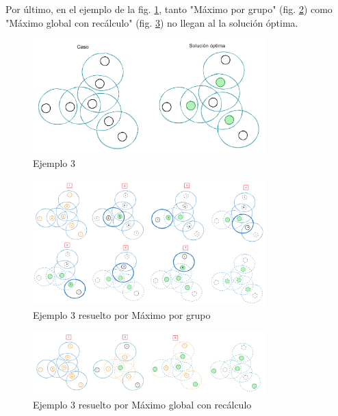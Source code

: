 Por último, en el ejemplo de la fig. \ref{fig:greedy_ej3}, tanto "Máximo por grupo" (fig. \ref{fig:greedy_ej3_mpg}) como "Máximo global con recálculo" (fig. \ref{fig:greedy_ej3_mgr}) no llegan al la solución óptima.

\begin{figure}[H]
    \centering
    \includegraphics[width=0.8\textwidth]{img/greedy_ej3.png}
    \caption{Ejemplo 3}
    \label{fig:greedy_ej3}
\end{figure}

\begin{figure}[H]
    \centering
    \includegraphics[width=0.8\textwidth]{img/greedy_ej3_mpg.png}
    \caption{Ejemplo 3 resuelto por Máximo por grupo}
    \label{fig:greedy_ej3_mpg}
\end{figure}

\begin{figure}[H]
    \centering
    \includegraphics[width=0.8\textwidth]{img/greedy_ej3_mgr.png}
    \caption{Ejemplo 3 resuelto por Máximo global con recálculo}
    \label{fig:greedy_ej3_mgr}
\end{figure}